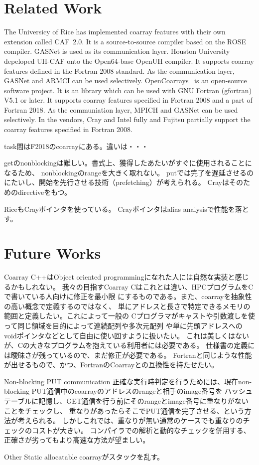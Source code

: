 \section{Related Work}\label{sec:related}

The Universicy of Rice has implemented coarray features with their own extension called CAF~2.0.
It is a source-to-source compiler based on the ROSE compiler. GASNet is used as its 
communication layer.
%
Houston University depeloped UH-CAF onto the Open64-base OpenUH compiler. It supports
coarray features defined in the Fortran 2008 standard. As the communication layer,
GASNet and ARMCI can be used selectively.
%
OpenCoarrays~\cite{OpenCo} is an open-source software project. It is an library 
which can be used with GNU Fortran (gfortran) V5.1 or later. It supports coarray features
specified in Fortran 2008 and a part of Fortran 2018.  As the communiation layer,
MPICH and GASNet can be used selectively.
%
In the vendors, Cray and Intel fully and Fujitsu partially support the coarray features
specified in Fortran 2008.


task間はF2018のcoarrayにある。違いは・・・

getのnonblockingは難しい。書式上、獲得したあたいがすぐに使用されることになるため、
nonblockingのrangeを大きく取れない。
putでは完了を遅延させるのにたいし、開始を先行させる技術（prefetching）が考えられる。
Crayはそのためのdirectiveをもつ。

RiceもCrayポインタを使っている。
Crayポインタはalias analysisで性能を落とす。


\section{Future Works}\label{sec:related}

Coarray C++はObject oriented programmingになれた人には自然な実装と感じるかもしれない。
我々の目指すCoarray Cはこれとは違い、HPCプログラムをCで書いている人向けに修正を最小限
にするものである。また、coarrayを抽象性の高い概念で定義するのではなく、
単にアドレスと長さで特定できるメモリの範囲と定義したい。これによって一般の
Cプログラマがキャストや引数渡しを使って同じ領域を目的によって連続配列や多次元配列
や単に先頭アドレスへのvoidポインタなどとして自由に使い回すように扱いたい。
これは美しくはないが、Cの大きなプログラムを抱えている利用者には必要である。
仕様書の定義には曖昧さが残っているので、まだ修正が必要である。
Fortranと同じような性能が出せるもので、かつ、FortranのCoarrayとの互換性を持たせたい。

Non-blocking PUT communication 
正確な実行時判定を行うためには、現在non-blocking PUT通信中のcoarrayのアドレスのrangeと相手のimage番号を
ハッシュテーブルに記憶し、GET通信を行う前にそのrangeとimage番号に重なりがないことをチェックし、
重なりがあったらそこでPUT通信を完了させる、という方法が考えられる。
しかしこれでは、重なりが無い通常のケースでも重なりのチェックのコストが大きい。
コンパイラでの解析と動的なチェックを併用する、正確さが劣ってもより高速な方法が望ましい。

Other
Static allocatable coarrayがスタックを乱す。

